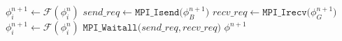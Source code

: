 \begin{algorithm}[htbp]
\caption{$\phi^{n+1} \gets \texttt{Overlap (}\phi^n, \mathcal{F}\texttt{)}$}\label{euclid}
\begin{algorithmic}[1]
 
	\State $\phi^{n+1}_i \gets \mathcal{F}(\phi_i^n)$
\EndFor
\State $send\_req \gets \texttt{MPI\_Isend(}\phi^{n+1}_B\texttt{)}$ 
\State $recv\_req \gets \texttt{MPI\_Irecv(}\phi^{n+1}_G\texttt{)}$
 
	\State $\phi^{n+1}_i \gets \mathcal{F}(\phi_i^n)$ 
\EndFor
\State $\texttt{MPI\_Waitall(}send\_req, recv\_req\texttt{)}$ 
\State \Return $\phi^{n+1}$
\end{algorithmic}
\label{alg:overlap}
\end{algorithm}